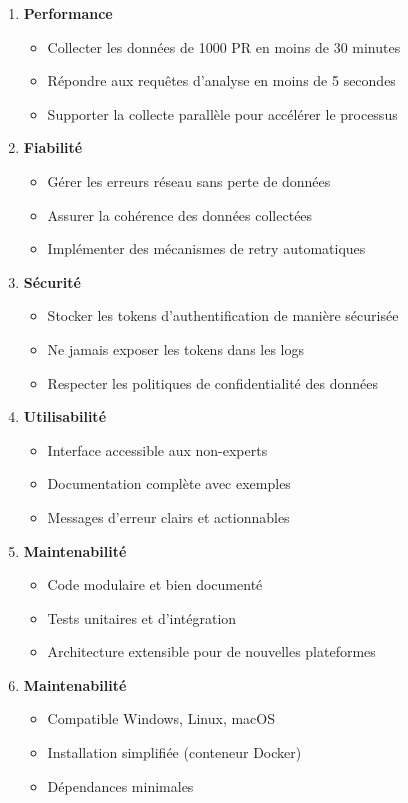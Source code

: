 \begin{enumerate}
    \item \textbf{Performance}
    \begin{itemize}
    \item Collecter les données de 1000 PR en moins de 30 minutes
    \item Répondre aux requêtes d'analyse en moins de 5 secondes
    \item Supporter la collecte parallèle pour accélérer le processus
    \end{itemize}

    \item \textbf{Fiabilité}
    \begin{itemize}
    \item Gérer les erreurs réseau sans perte de données
    \item Assurer la cohérence des données collectées
    \item Implémenter des mécanismes de retry automatiques
    \end{itemize}

    \item \textbf{Sécurité}
    \begin{itemize}
    \item Stocker les tokens d'authentification de manière sécurisée
    \item Ne jamais exposer les tokens dans les logs
    \item Respecter les politiques de confidentialité des données
    \end{itemize}

    \item \textbf{Utilisabilité}
    \begin{itemize}
    \item Interface accessible aux non-experts
    \item Documentation complète avec exemples
    \item Messages d'erreur clairs et actionnables
    \end{itemize}

    \item \textbf{Maintenabilité}
    \begin{itemize}
    \item Code modulaire et bien documenté
    \item Tests unitaires et d'intégration
    \item Architecture extensible pour de nouvelles plateformes
    \end{itemize}

    \item \textbf{Maintenabilité}
    \begin{itemize}
    \item Compatible Windows, Linux, macOS
    \item Installation simplifiée (conteneur Docker)
    \item Dépendances minimales
    \end{itemize}
    
\end{enumerate}


